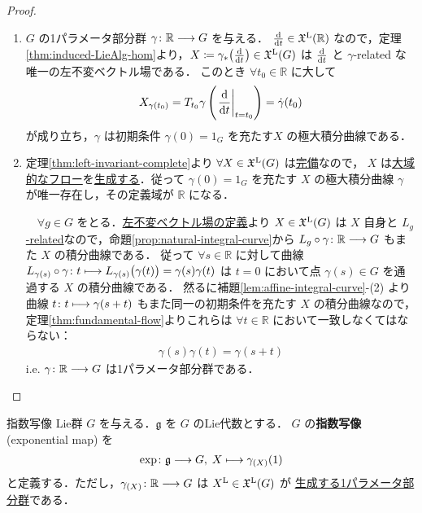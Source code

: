 \documentclass[TQFT_main]{subfiles}
\begin{document}
\begin{proof}
    \begin{enumerate}
        \item $G$ の1パラメータ部分群 $\gamma \colon \mathbb{R} \longrightarrow G$ を与える．
        $\dv{}{t} \in \mathfrak{X}^{\mathrm{L}}(\mathbb{R})$ なので，定理\ref{thm:induced-LieAlg-hom}より，$X \coloneqq \gamma_* \bigl(\dv{}{t}\bigr) \in \mathfrak{X}^{\mathrm{L}}(G)$ は $\dv{}{t}$ と $\gamma$-related な唯一の左不変ベクトル場である．
        このとき $\forall t_0 \in \mathbb{R}$ に大して
        \begin{align}
            X_{\gamma(t_0)} = T_{t_0} \gamma \left( \eval{\dv{}{t}}_{t=t_0} \right) = \dot{\gamma}(t_0)
        \end{align}
        が成り立ち，$\gamma$ は初期条件 $\gamma(0) = 1_G$ を充たす$X$ の極大積分曲線である．
        \item 定理\ref{thm:left-invariant-complete}より $\forall X \in \mathfrak{X}^{\mathrm{L}}(G)$ は\hyperref[def:complete-vecf]{完備}なので，
        $X$ は\hyperref[def:global-flow]{大域的なフロー}を\hyperref[thm:fundamental-flow]{生成する}．従って $\gamma(0) = 1_G$ を充たす $X$ の極大積分曲線 $\gamma$ が唯一存在し，その定義域が $\mathbb{R}$ になる．
        
        　$\forall g \in G$ をとる．\hyperref[def:left-invariant]{左不変ベクトル場の定義}より $X \in \mathfrak{X}^{\mathrm{L}}(G)$ は $X$ 自身と \hyperref[def:F-related]{$L_g$-related}なので，命題\ref{prop:natural-integral-curve}から $L_g \circ \gamma \colon \mathbb{R} \longrightarrow G$ もまた $X$ の積分曲線である．
        従って $\forall s \in \mathbb{R}$ に対して曲線 $L_{\gamma(s)} \circ \gamma \colon t \longmapsto L_{\gamma(s)} \bigl( \gamma(t) \bigr) = \gamma(s) \gamma(t)$ は $t=0$ において点 $\gamma(s) \in G$ を通過する $X$ の積分曲線である．
        然るに補題\ref{lem:affine-integral-curve}-(2) より曲線 $t \colon t \longmapsto \gamma(s+t)$ もまた同一の初期条件を充たす $X$ の積分曲線なので，定理\ref{thm:fundamental-flow}よりこれらは $\forall t \in \mathbb{R}$ において一致しなくてはならない：
        \begin{align}
            \gamma(s) \gamma(t) = \gamma(s+t)
        \end{align}
        i.e. $\gamma \colon \mathbb{R} \longrightarrow G$ は1パラメータ部分群である．
    \end{enumerate}
    
\end{proof}

\begin{mydef}[label=def:exp]{指数写像}
    Lie群 $G$ を与える．$\mathfrak{g}$ を $G$ のLie代数とする．
    $G$ の\textbf{指数写像} (exponential map) を
    \begin{align}
        \exp \colon \mathfrak{g} \longrightarrow G,\; X \longmapsto \gamma_{(X)}(1)
    \end{align}
    と定義する．ただし，$\gamma_{(X)} \colon \mathbb{R} \longrightarrow G$ は $X^{\mathrm{L}} \in \mathfrak{X}^{\mathrm{L}}(G)$ が \hyperref[prop:one-parameter-basic]{生成する1パラメータ部分群}である．
\end{mydef}
\end{document}

